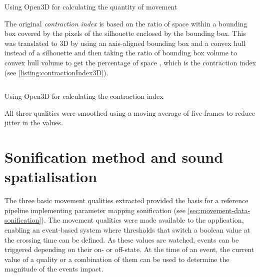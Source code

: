 \begin{listing}[!ht]
\inputminted{python}{04_Artefakte/03_Listings/quantity-of-movement.py}
\caption{Using Open3D for calculating the quantity of movement\protect}
\label{listing:quantityOfMovement3D}
\end{listing}

The original \emph{contraction index} is based on the ratio of space within a bounding box covered by the pixels of the silhouette enclosed by the bounding box.
This was translated to \ac{3D} by using an axis-aligned bounding box and a convex hull instead of a silhouette and then taking the ratio of bounding box volume to convex hull volume to get the percentage of space , which is the contraction index (see \autoref{listing:contractionIndex3D}).

\begin{listing}[!ht]
\inputminted{python}{04_Artefakte/03_Listings/contraction-index.py}
\caption{Using Open3D for calculating the contraction index\protect}
\label{listing:contractionIndex3D}
\end{listing}

All three qualities were smoothed using a moving average of five frames to reduce jitter in the values.

\section{Sonification method and sound spatialisation}
\label{sec:sonification-method-and-sound-spatialisation}

The three basic movement qualities extracted provided the basis for a reference pipeline implementing parameter mapping sonification (see \autoref{sec:movement-data-sonification}).
The movement qualities were made available to the application, enabling an event-based system where thresholds that switch a boolean value at the crossing time can be defined.
As these values are watched, events can be triggered depending on their on- or off-state.
At the time of an event, the current value of a quality or a combination of them can be used to determine the magnitude of the event\textquotesingle s impact.

